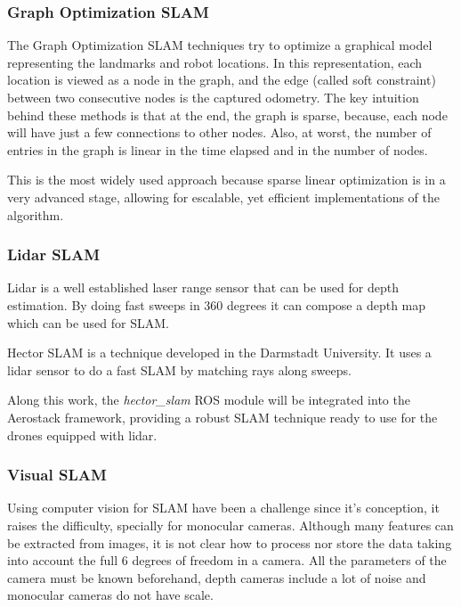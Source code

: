     \subsubsection{Graph Optimization SLAM}

      The Graph Optimization SLAM techniques try to optimize a graphical model representing the landmarks and robot locations. In this representation, each location is viewed as a node in the graph, and the edge (called soft constraint) between two consecutive nodes is the captured odometry. The key intuition behind these methods is that at the end, the graph is sparse, because, each node will have just a few connections to other nodes. Also, at worst, the number of entries in the graph is linear in the time elapsed and in the number of nodes.

      This is the most widely used approach because sparse linear optimization is in a very advanced stage, allowing for escalable, yet efficient implementations of the algorithm.

    \subsubsection{Lidar SLAM}

      Lidar is a well established laser range sensor that can be used for depth estimation. By doing fast sweeps in 360 degrees it can compose a depth map which can be used for SLAM.

      Hector SLAM \cite{hector_slam} is a technique developed in the Darmstadt University. It uses a lidar sensor to do a fast SLAM by matching rays along sweeps.

      Along this work, the \textit{hector\_slam} ROS module will be integrated into the Aerostack framework, providing a robust SLAM technique ready to use for the drones equipped with lidar.

    \subsubsection{Visual SLAM}

      Using computer vision for SLAM have been a challenge since it's conception, it raises the difficulty, specially for monocular cameras. Although many features can be extracted from images, it is not clear how to process nor store the data taking into account the full 6 degrees of freedom in a camera. All the parameters of the camera must be known beforehand, depth cameras include a lot of noise and monocular cameras do not have scale.

